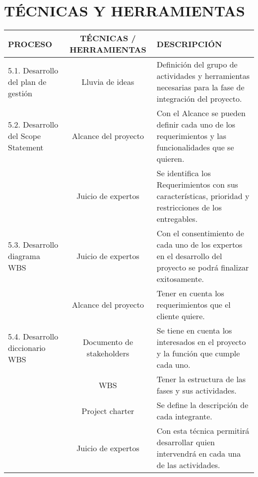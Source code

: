 \chapter{T\'ECNICAS Y HERRAMIENTAS}
%
\begin{table}[H]
	\centering
	\begin{tabular}{| m{5cm} | c | p{5cm} |}
	\hline
	\textbf{PROCESO} & \textbf{T\'ECNICAS / HERRAMIENTAS} & \textbf{DESCRIPCI\'ON} \\ \hline
	5.1. Desarrollo del plan de gesti\'on & Lluvia de ideas & Definici\'on del grupo de actividades y herramientas 
	necesarias para la fase de integraci\'on del proyecto.\\
	\hline
	5.2. Desarrollo del Scope Statement & Alcance del proyecto & Con el Alcance se pueden definir cada uno de los 
	requerimientos y las funcionalidades que se quieren.\\ 
	  \cline{2-3}
	 & Juicio de expertos & Se identifica los Requerimientos con sus caracter\'isticas, prioridad y restricciones 
	 de los entregables. \\
	\hline
	5.3. Desarrollo diagrama WBS & Juicio de expertos & Con el consentimiento  de cada uno de los expertos en el 
	desarrollo del proyecto  se podr\'a finalizar exitosamente.\\
	\cline{2-3}
	& Alcance del proyecto & Tener en cuenta  los  requerimientos que el cliente quiere.\\
	\hline
	5.4. Desarrollo diccionario WBS & Documento de stakeholders & Se tiene en cuenta los interesados en el proyecto 
	y la funci\'on que cumple cada uno.\\
	\cline{2-3}
	& WBS & Tener la estructura de las fases y sus actividades.\\
	\cline{2-3}
	& Project charter & Se define la descripci\'on de cada integrante.\\
	\cline{2-3}
	& Juicio de expertos & Con esta t\'ecnica permitir\'a desarrollar quien intervendr\'a en cada una de las 
	actividades.\\
	\hline
	\end{tabular}
	
\end{table}